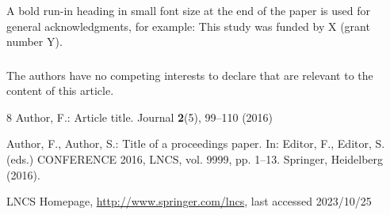 \documentclass[runningheads]{llncs}
\begin{document}
\begin{credits}
\subsubsection{\ackname} A bold run-in heading in small font size at the end of the paper is
used for general acknowledgments, for example: This study was funded
by X (grant number Y).

\subsubsection{\discintname}
The authors have no competing interests to declare that are
relevant to the content of this article.
\end{credits}
%
%
%
% 
% 
%
\begin{thebibliography}{8}
Author, F.: Article title. Journal \textbf{2}(5), 99--110 (2016)

Author, F., Author, S.: Title of a proceedings paper. In: Editor,
F., Editor, S. (eds.) CONFERENCE 2016, LNCS, vol. 9999, pp. 1--13.
Springer, Heidelberg (2016). 


LNCS Homepage, \url{http://www.springer.com/lncs}, last accessed 2023/10/25
\end{thebibliography}
\end{document}

